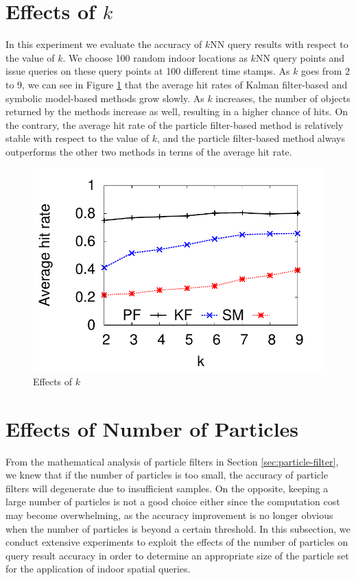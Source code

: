 \documentclass[12pt]{report}
\begin{document}
\section{Effects of \(k\)}
\label{sec:org0bd629d}

In this experiment we evaluate the accuracy of \(k\)NN query
results with respect to the value of \(k\).  We choose 100 random
indoor locations as \(k\)NN query points and issue queries on
these query points at 100 different time stamps.  As \(k\) goes
from 2 to 9, we can see in Figure \ref{fig:k} that the average hit rates
of Kalman filter-based and symbolic model-based methods grow
slowly.  As \(k\) increases, the number of objects returned by the
methods increase as well, resulting in a higher chance of hits.
On the contrary, the average hit rate of the particle filter-based
method is relatively stable with respect to the value of \(k\),
and the particle filter-based method always outperforms the other
two methods in terms of the average hit rate.

\begin{figure}[htbp]
\centering
\includegraphics[width=.5\textwidth]{img/hit-k.pdf}
\caption{\label{fig:k}
Effects of \(k\)}
\end{figure}

\section{Effects of Number of Particles}
\label{sec:orgcfda28c}

From the mathematical analysis of particle filters in Section
\ref{sec:particle-filter}, we knew that if the number of particles is
too small, the accuracy of particle filters will degenerate due to
insufficient samples.  On the opposite, keeping a large number of
particles is not a good choice either since the computation cost
may become overwhelming, as the accuracy improvement is no longer
obvious when the number of particles is beyond a certain
threshold.  In this subsection, we conduct extensive experiments
to exploit the effects of the number of particles on query result
accuracy in order to determine an appropriate size of the particle
set for the application of indoor spatial queries.
\end{document}
